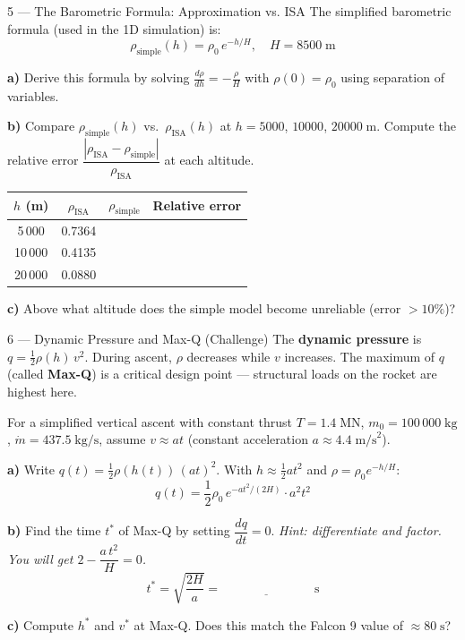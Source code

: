 \documentclass[12pt, a4paper]{article}
\begin{document}
\begin{solutionspace}[9cm]
\end{solutionspace}

\begin{exercisebox}{5 — The Barometric Formula: Approximation vs. ISA}
The simplified barometric formula (used in the 1D simulation) is:
\[
  \rho_\text{simple}(h) = \rho_0\,e^{-h/H}, \quad H = 8500\;\text{m}
\]

\textbf{a)} Derive this formula by solving $\frac{d\rho}{dh} = -\frac{\rho}{H}$ with $\rho(0) = \rho_0$ using separation of variables.

\textbf{b)} Compare $\rho_\text{simple}(h)$ vs.\ $\rho_\text{ISA}(h)$ at $h = 5000$, $10000$, $20000\;\text{m}$.
Compute the relative error $\dfrac{|\rho_\text{ISA} - \rho_\text{simple}|}{\rho_\text{ISA}}$ at each altitude.

\begin{center}
\begin{tabular}{|c|c|c|c|}
\hline
$h$ (m) & $\rho_\text{ISA}$ & $\rho_\text{simple}$ & Relative error \\
\hline
5\,000 & 0.7364 & & \\
\hline
10\,000 & 0.4135 & & \\
\hline
20\,000 & 0.0880 & & \\
\hline
\end{tabular}
\end{center}

\textbf{c)} Above what altitude does the simple model become unreliable (error $> 10\%$)?
\end{exercisebox}

\begin{solutionspace}[8cm]
\end{solutionspace}

\begin{exercisebox}{6 — Dynamic Pressure and Max-Q (Challenge)}
The \textbf{dynamic pressure} is $q = \frac{1}{2}\rho(h)\,v^2$.
During ascent, $\rho$ decreases while $v$ increases. The maximum of $q$ (called \textbf{Max-Q}) is a critical design point — structural loads on the rocket are highest here.

For a simplified vertical ascent with constant thrust $T = 1.4\;\text{MN}$, $m_0 = 100\,000\;\text{kg}$, $\dot{m} = 437.5\;\text{kg/s}$, assume $v \approx at$ (constant acceleration $a \approx 4.4\;\text{m/s}^2$).

\textbf{a)} Write $q(t) = \frac{1}{2}\rho(h(t))\,(at)^2$. With $h \approx \frac{1}{2}at^2$ and $\rho = \rho_0 e^{-h/H}$:
\[
  q(t) = \frac{1}{2}\rho_0\,e^{-at^2/(2H)} \cdot a^2 t^2
\]

\textbf{b)} Find the time $t^*$ of Max-Q by setting $\dfrac{dq}{dt} = 0$.
\textit{Hint: differentiate and factor. You will get $2 - \dfrac{a\,t^2}{H} = 0$.}
\[
  t^* = \sqrt{\frac{2H}{a}} = \underline{\hspace{3cm}}\;\text{s}
\]

\textbf{c)} Compute $h^*$ and $v^*$ at Max-Q. Does this match the Falcon 9 value of $\approx 80\;\text{s}$?
\end{exercisebox}
\end{document}
